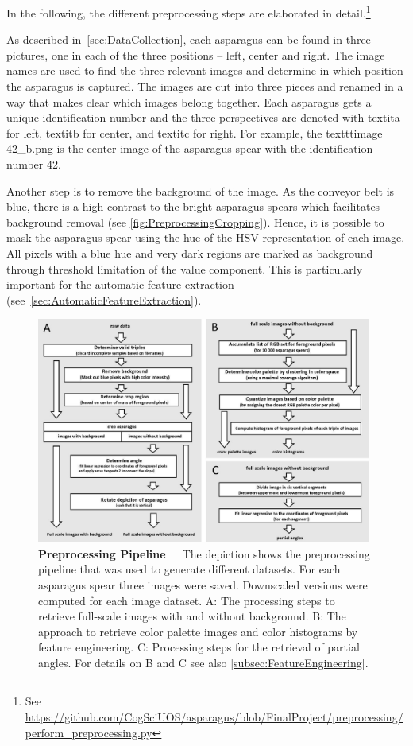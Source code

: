 In the following, the different preprocessing steps are elaborated in detail.\footnote{See \url{https://github.com/CogSciUOS/asparagus/blob/FinalProject/preprocessing/perform\_preprocessing.py}}

\bigskip
As described in~\autoref{sec:DataCollection}, each asparagus can be found in three pictures, one in each of the three positions – left, center and right. The image names are used to find the three relevant images and determine in which position the asparagus is captured. The images are cut into three pieces and renamed in a way that makes clear which images belong together. Each asparagus gets a unique identification number and the three perspectives are denoted with textit{a} for left, textit{b} for center, and textit{c} for right. For example, the texttt{image 42\_b.png} is the center image of the asparagus spear with the identification number 42. 

Another step is to remove the background of the image. As the conveyor belt is blue, there is a high contrast to the bright asparagus spears which facilitates background removal  (see \autoref{fig:PreprocessingCropping}). Hence, it is possible to mask the asparagus spear using the hue of the HSV representation of each image. All pixels with a blue hue and very dark regions are marked as background through threshold limitation of the value component. This is particularly important for the automatic feature extraction (see~\autoref{sec:AutomaticFeatureExtraction}).

\begin{figure}[!ht]
	\centering
	\includegraphics[width=0.98\textwidth]{Figures/chapter03/preprocessing_pipeline.png}
	\decoRule
	\caption[Preprocessing Pipeline]{\textbf{Preprocessing Pipeline}~~~The depiction shows the preprocessing pipeline that was used to generate different datasets. For each asparagus spear three images were saved. Downscaled versions were computed for each image dataset. A: The processing steps to retrieve full-scale images with and without background. B:  The approach to retrieve color palette images and color histograms by feature engineering. C: Processing steps for the retrieval of partial angles. For details on B and C see also \autoref{subsec:FeatureEngineering}.}
	\label{fig:PreprocessingPipeline}
\end{figure}

